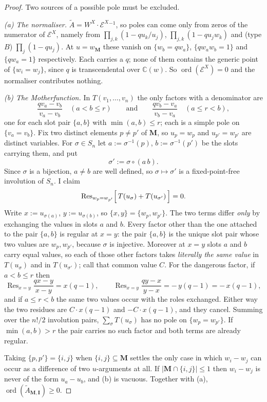 \documentclass[11pt]{article}
\theoremstyle{plain}
\theoremstyle{definition}
\theoremstyle{remark}
\theoremstyle{plain}
\newcommand{\bI}{\mathbf{I}}
\newcommand{\bM}{\mathbf{M}}
\newcommand{\At}{\widetilde{A}}
\newcommand{\ord}{\operatorname{ord}}
\newcommand{\Res}{\operatorname{Res}}
\begin{document}
\begin{proof}
Two sources of a possible pole must be excluded.

\emph{(a) The normaliser.}  $\At=W^X\cdot\mathcal{E}^X{}^{-1}$, so poles can come
only from zeros of the numerator of $\mathcal{E}^X$, namely from
$\prod_{j,k}(1-qu_k/u_j)$, $\prod_{j,k}(1-qu_jw_k)$ and (type $B$)
$\prod_j(1-qu_j)$.  At $u=w_\bM$ these vanish on $\{w_b=qw_a\}$,
$\{qw_aw_b=1\}$ and $\{qw_a=1\}$ respectively.  Each carries a $q$; none of them
contains the generic point of $\{w_i=w_j\}$, since $q$ is transcendental over
$\mathbb{C}(w)$.  So $\ord(\mathcal{E}^X)=0$ and the normaliser contributes
nothing.

\emph{(b) The Motherfunction.}  In $T(v_1,\dots,v_n)$ the only factors with a
denominator are
\[
   \frac{qv_a-v_b}{v_a-v_b}\quad (a<b\le r)
   \qquad\text{and}\qquad
   \frac{qv_b-v_a}{v_b-v_a}\quad (a\le r<b),
\]
one for each slot pair $\{a,b\}$ with $\min(a,b)\le r$; each is a simple pole on
$\{v_a=v_b\}$.  Fix two distinct elements $p\ne p'$ of $\bM$, so $u_p=w_p$ and
$u_{p'}=w_{p'}$ are distinct variables.  For $\sigma\in S_n$ let
$a:=\sigma^{-1}(p)$, $b:=\sigma^{-1}(p')$ be the slots carrying them, and put
\[
   \sigma':=\sigma\circ(a\,b).
\]
Since $\sigma$ is a bijection, $a\ne b$ are well defined, so
$\sigma\mapsto\sigma'$ is a fixed-point-free involution of $S_n$.  I claim
\[
   \Res_{w_p=w_{p'}}\Bigl[\,T(u_\sigma)+T(u_{\sigma'})\,\Bigr]=0 .
\]
Write $x:=u_{\sigma(a)}$, $y:=u_{\sigma(b)}$, so $\{x,y\}=\{w_p,w_{p'}\}$.  The
two terms differ \emph{only} by exchanging the values in slots $a$ and $b$.
Every factor other than the one attached to the pair $\{a,b\}$ is regular at
$x=y$: the pair $\{a,b\}$ is the unique slot pair whose two values are
$w_p,w_{p'}$, because $\sigma$ is injective.  Moreover at $x=y$ slots $a$ and $b$
carry equal values, so each of those other factors takes \emph{literally the same
value} in $T(u_\sigma)$ and in $T(u_{\sigma'})$; call that common value $C$.
For the dangerous factor, if $a<b\le r$ then
\[
  \Res_{x=y}\frac{qx-y}{x-y}=x(q-1),
  \qquad
  \Res_{x=y}\frac{qy-x}{y-x}=-\,y(q-1)=-\,x(q-1),
\]
and if $a\le r<b$ the same two values occur with the roles exchanged.  Either way
the two residues are $C\cdot x(q-1)$ and $-C\cdot x(q-1)$, and they cancel.
Summing over the $n!/2$ involution pairs, $\sum_\sigma T(u_\sigma)$ has no pole
on $\{w_p=w_{p'}\}$.  If $\min(a,b)>r$ the pair carries no such factor and both
terms are already regular.

Taking $\{p,p'\}=\{i,j\}$ when $\{i,j\}\subseteq\bM$ settles the only case in
which $w_i-w_j$ can occur as a difference of two $u$-arguments at all.  If
$|\bM\cap\{i,j\}|\le1$ then $w_i-w_j$ is never of the form $u_a-u_b$, and (b) is
vacuous.  Together with (a), $\ord(\At_{\bM,\bI})\ge0$.
\end{proof}
\end{document}
